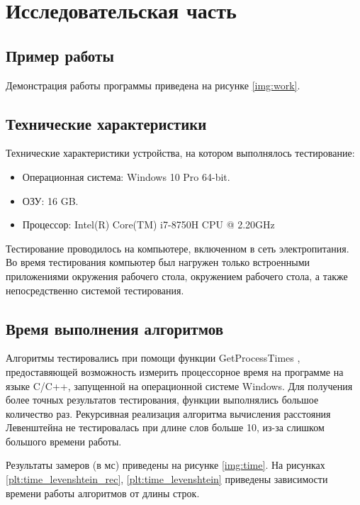 \chapter{Исследовательская часть}

\section{Пример работы}

Демонстрация работы программы приведена на рисунке \ref{img:work}.


\section{Технические характеристики}

Технические характеристики устройства, на котором выполнялось тестирование:

\begin{itemize}
	\item Операционная система: Windows 10 Pro \cite{windows} 64-bit.
	\item ОЗУ: 16 GB.
	\item Процессор: Intel(R) Core(TM) i7-8750H CPU @ 2.20GHz \cite{Intel}
\end{itemize}

Тестирование проводилось на компьютере, включенном в сеть электропитания. Во время тестирования компьютер был нагружен только встроенными приложениями окружения рабочего стола, окружением рабочего стола, а также непосредственно системой тестирования.

\section{Время выполнения алгоритмов}

Алгоритмы тестировались при помощи функции GetProcessTimes \cite{GetProcessTimes}, предоставяющей возможность измерить процессорное время на программе на языке C/C++, запущенной на операционной системе Windows. Для получения более точных результатов тестирования, функции выполнялись большое количество раз. Рекурсивная реализация алгоритма вычисления расстояния Левенштейна не тестировалась при длине слов больше 10, из-за слишком большого времени работы.

Результаты замеров (в мс) приведены на рисунке \ref{img:time}.
На рисунках \ref{plt:time_levenshtein_rec}, \ref{plt:time_levenshtein} приведены зависимости времени работы алгоритмов от длины строк.

